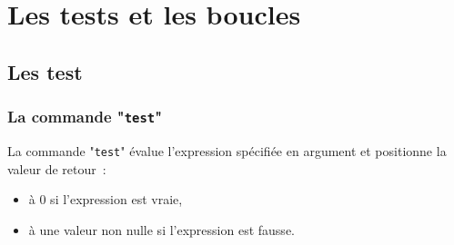 %
%

\setcounter{remarque-cnt}{1}
\setcounter{example-cnt}{1}
\chapter{Les tests et les boucles}

\section{Les test}

\subsection{La commande "\texttt{test}"}

La commande "\texttt{test}" {\'e}value l'expression sp{\'e}cifi{\'e}e en argument et positionne la valeur de retour~:
\begin{itemize}
	\item	{\`a} 0 si l'expression est vraie, 
	\item	{\`a} une valeur non nulle si l'expression est fausse.
\end{itemize}

